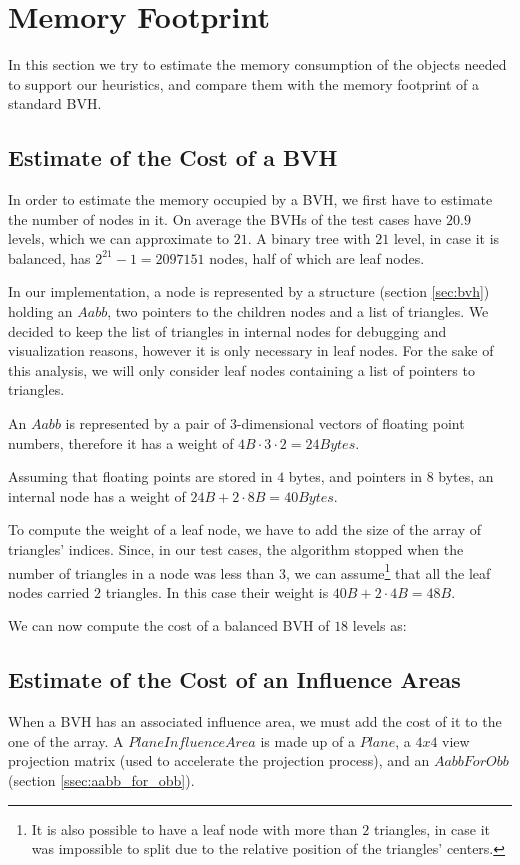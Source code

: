 \documentclass{PoliMi_MasterThesis}
\begin{document}
\section{Memory Footprint} \label{sec:memory_footprint}
In this section we try to estimate the memory consumption of the objects needed to support our heuristics, and compare them with the memory footprint of a standard BVH.

\subsection*{Estimate of the Cost of a BVH}
In order to estimate the memory occupied by a BVH, we first have to estimate the number of nodes in it. On average the BVHs of the test cases have $20.9$ levels, which we can approximate to $21$. A binary tree with $21$ level, in case it is balanced, has $2^{21}-1 = 2097151$ nodes, half of which are leaf nodes.

In our implementation, a node is represented by a structure (section \ref{sec:bvh}) holding an $Aabb$, two pointers to the children nodes and a list of triangles. We decided to keep the list of triangles in internal nodes for debugging and visualization reasons, however it is only necessary in leaf nodes. For the sake of this analysis, we will only consider leaf nodes containing a list of pointers to triangles. 

An $Aabb$ is represented by a pair of 3-dimensional vectors of floating point numbers, therefore it has a weight of $4B \cdot 3 \cdot 2 = 24 Bytes$.

Assuming that floating points are stored in $4$ bytes, and pointers in $8$ bytes, an internal node has a weight of $24B + 2 \cdot 8B = 40 Bytes$. 

To compute the weight of a leaf node, we have to add the size of the array of triangles' indices. Since, in our test cases, the algorithm stopped when the number of triangles in a node was less than 3, we can assume\footnote{It is also possible to have a leaf node with more than $2$ triangles, in case it was impossible to split due to the relative position of the triangles' centers.} that all the leaf nodes carried $2$ triangles. In this case their weight is $40B + 2 \cdot 4B = 48B$.

We can now compute the cost of a balanced BVH of $18$ levels as:
\unboldmath

\subsection*{Estimate of the Cost of an Influence Areas}
When a BVH has an associated influence area, we must add the cost of it to the one of the array. A $PlaneInfluenceArea$ is made up of a $Plane$, a $4x4$ view projection matrix (used to accelerate the projection process), and an $AabbForObb$ (section \ref{ssec:aabb_for_obb}).
\end{document}
